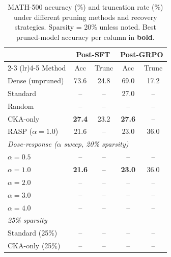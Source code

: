\begin{table}[t]
\centering
\small
\caption{MATH-500 accuracy (\%) and truncation rate (\%) under different pruning methods and recovery strategies. Sparsity = 20\% unless noted. Best pruned-model accuracy per column in \textbf{bold}.}
\label{tab:math500}
\begin{tabular}{l cc cc}
\toprule
& \multicolumn{2}{c}{\textbf{Post-SFT}} & \multicolumn{2}{c}{\textbf{Post-GRPO}} \\
\cmidrule(lr){2-3} \cmidrule(lr){4-5}
Method & Acc & Trunc & Acc & Trunc \\
\midrule
    Dense (unpruned) & 73.6 & 24.8 & 69.0 & 17.2 \\
\midrule
    Standard & -- & -- & 27.0 & -- \\
    Random & -- & -- & -- & -- \\
    CKA-only & \textbf{27.4} & 23.2 & \textbf{27.6} & -- \\
    RASP ($\alpha\!=\!1.0$) & 21.6 & -- & 23.0 & 36.0 \\
\midrule
\multicolumn{5}{l}{\textit{Dose-response ($\alpha$ sweep, 20\% sparsity)}} \\
    $\alpha = 0.5$ & -- & -- & -- & -- \\
    $\alpha = 1.0$ & \textbf{21.6} & -- & \textbf{23.0} & 36.0 \\
    $\alpha = 2.0$ & -- & -- & -- & -- \\
    $\alpha = 3.0$ & -- & -- & -- & -- \\
    $\alpha = 4.0$ & -- & -- & -- & -- \\
\midrule
\multicolumn{5}{l}{\textit{25\% sparsity}} \\
    Standard (25\%) & -- & -- & -- & -- \\
    CKA-only (25\%) & -- & -- & -- & -- \\
\bottomrule
\end{tabular}
\end{table}
